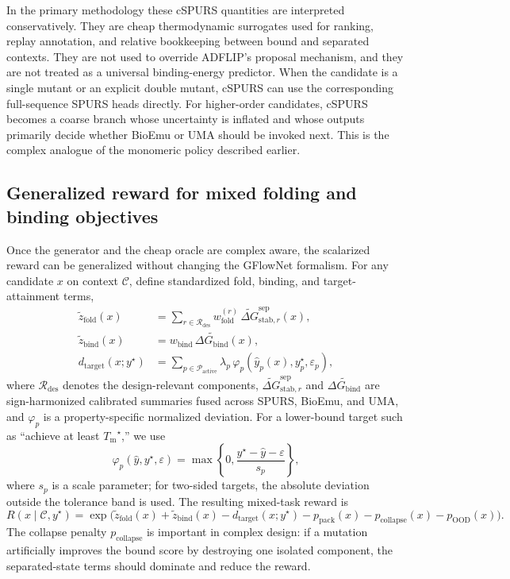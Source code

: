 \documentclass[11pt]{article}
\newcommand{\Tm}{\ensuremath{T_{\mathrm m}}}
\newcommand{\DGbind}{\ensuremath{\Delta G_{\mathrm{bind}}}}
\begin{document}
	In the primary methodology these cSPURS quantities are interpreted conservatively. They are cheap thermodynamic surrogates used for ranking, replay annotation, and relative bookkeeping between bound and separated contexts. They are not used to override ADFLIP's proposal mechanism, and they are not treated as a universal binding-energy predictor. When the candidate is a single mutant or an explicit double mutant, cSPURS can use the corresponding full-sequence SPURS heads directly. For higher-order candidates, cSPURS becomes a coarse branch whose uncertainty is inflated and whose outputs primarily decide whether BioEmu or UMA should be invoked next. This is the complex analogue of the monomeric policy described earlier.
	
	
	\subsection{Generalized reward for mixed folding and binding objectives}
	
	Once the generator and the cheap oracle are complex aware, the scalarized reward can be generalized without changing the GFlowNet formalism. For any candidate $x$ on context $\mathcal{C}$, define standardized fold, binding, and target-attainment terms,
	\begin{align}
		\tilde z_{\mathrm{fold}}(x) &= \sum_{r\in\mathcal{R}_{\mathrm{des}}} w^{(r)}_{\mathrm{fold}}\,\widetilde{\Delta G}^{\mathrm{sep}}_{\mathrm{stab},r}(x),\\
		\tilde z_{\mathrm{bind}}(x) &= w_{\mathrm{bind}}\,\widetilde{\DGbind}(x),\\
		d_{\mathrm{target}}(x;y^\star) &= \sum_{p\in\mathcal{P}_{\mathrm{active}}} \lambda_p\,\varphi_p\!\left(\hat y_p(x),y_p^\star,\varepsilon_p\right),
	\end{align}
	where $\mathcal{R}_{\mathrm{des}}$ denotes the design-relevant components, $\widetilde{\Delta G}^{\mathrm{sep}}_{\mathrm{stab},r}$ and $\widetilde{\DGbind}$ are sign-harmonized calibrated summaries fused across SPURS, BioEmu, and UMA, and $\varphi_p$ is a property-specific normalized deviation. For a lower-bound target such as ``achieve at least $\Tm^\star$,'' we use
	\begin{equation}
		\varphi_p(\hat y,y^\star,\varepsilon)=\max\!\left\{0,\frac{y^\star-\hat y-\varepsilon}{s_p}\right\},
	\end{equation}
	where $s_p$ is a scale parameter; for two-sided targets, the absolute deviation outside the tolerance band is used. The resulting mixed-task reward is
	\begin{equation}
		\label{eq:complexreward_v11}
		R(x\mid\mathcal{C},y^\star)=\exp\Big(\tilde z_{\mathrm{fold}}(x)+\tilde z_{\mathrm{bind}}(x)-d_{\mathrm{target}}(x;y^\star)-p_{\mathrm{pack}}(x)-p_{\mathrm{collapse}}(x)-p_{\mathrm{OOD}}(x)\Big).
	\end{equation}
	The collapse penalty $p_{\mathrm{collapse}}$ is important in complex design: if a mutation artificially improves the bound score by destroying one isolated component, the separated-state terms should dominate and reduce the reward.
	
\end{document}
